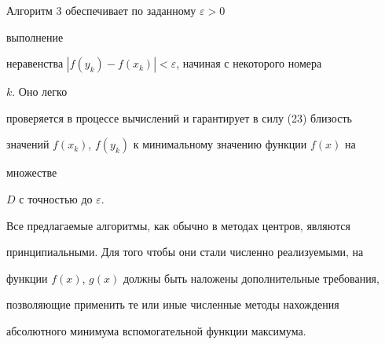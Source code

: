  


\begin{notenonum} Алгоритм 3 обеспечивает по заданному $\varepsilon>0$ 


выполнение 


неравенства $|f(y_k)-f(x_k)|<\varepsilon$, начиная с некоторого номера 


$k$. Оно легко 


проверяется в процессе вычислений и гарантирует в силу (23) близость 


значений $f(x_k)$, $f(y_k)$ к минимальному значению функции $f(x)$ на 


множестве 


$D$ с точностью до $\varepsilon$. 


\end{notenonum} 


 


Все предлагаемые алгоритмы, как обычно в методах центров, являются 


принципиальными. Для того чтобы они стали численно реализуемыми, на 


функции $f(x)$, $g(x)$ должны быть наложены дополнительные требования, 


позволяющие применить те или иные численные методы нахождения 


абсолютного минимума вспомогательной функции максимума. 


 


 


